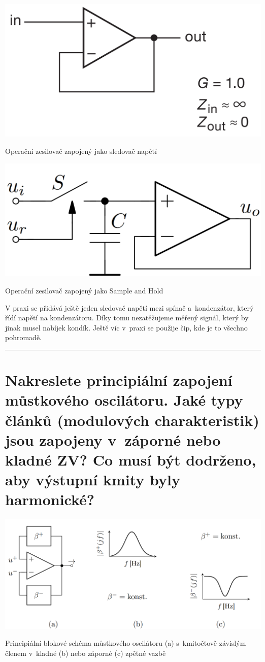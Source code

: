 \documentclass[a4paper,12pt]{article}   %
\begin{document}
\begin{schema}
    \centering
    \includegraphics[width=.5\textwidth]{voltage-follower.PNG}
    \caption{Operační zesilovač zapojený jako sledovač napětí}
    \label{sch:sledovac}
\end{schema}

\begin{schema}
    \centering
    \includegraphics[width=.5\textwidth]{sample_hold.PNG}
    \caption{Operační zesilovač zapojený jako Sample and Hold}
    \label{sch:sah}
\end{schema}

V praxi se přidává ještě jeden sledovač napětí mezi spínač a~kondenzátor, který řídí napětí na kondenzátoru. Díky tomu nezatěžujeme měřený signál, který by jinak musel nabíjek kondík. Ještě víc v~praxi se použije čip, kde je to všechno pohromadě.
\\
\hrule%












\newpage
\section{Nakreslete principiální zapojení můstkového oscilátoru. Jaké typy článků (modulových charakteristik) jsou zapojeny v~záporné nebo kladné ZV? Co musí být dodrženo, aby výstupní kmity byly harmonické?}
\begin{schema}[h!]
    \centering
    \includegraphics[width=.9\textwidth]{mustkovy-oscilator.PNG}
    \caption{Principiální blokové schéma můstkového oscilátoru (a) s~kmitočtově závislým členem v~kladné (b) nebo záporné (c) zpětné vazbě}
    \label{sch:mustkovy:oscilator}
\end{schema}
\end{document}
